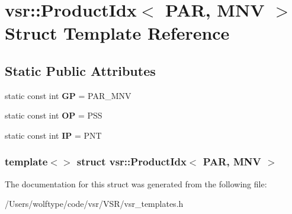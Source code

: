 \hypertarget{structvsr_1_1_product_idx_3_01_p_a_r_00_01_m_n_v_01_4}{\section{vsr\-:\-:Product\-Idx$<$ P\-A\-R, M\-N\-V $>$ Struct Template Reference}
\label{structvsr_1_1_product_idx_3_01_p_a_r_00_01_m_n_v_01_4}
}
\subsection*{Static Public Attributes}
\begin{DoxyCompactItemize}
\item 
\hypertarget{structvsr_1_1_product_idx_3_01_p_a_r_00_01_m_n_v_01_4_a95168749c4103690b52da3d3fae07b29}{static const int {\bfseries G\-P} = P\-A\-R\-\_\-\-M\-N\-V}\label{structvsr_1_1_product_idx_3_01_p_a_r_00_01_m_n_v_01_4_a95168749c4103690b52da3d3fae07b29}

\item 
\hypertarget{structvsr_1_1_product_idx_3_01_p_a_r_00_01_m_n_v_01_4_aedca912a60af592203b84b9476875cc1}{static const int {\bfseries O\-P} = P\-S\-S}\label{structvsr_1_1_product_idx_3_01_p_a_r_00_01_m_n_v_01_4_aedca912a60af592203b84b9476875cc1}

\item 
\hypertarget{structvsr_1_1_product_idx_3_01_p_a_r_00_01_m_n_v_01_4_a8d892c3050703d594eead2427c34d7a6}{static const int {\bfseries I\-P} = P\-N\-T}\label{structvsr_1_1_product_idx_3_01_p_a_r_00_01_m_n_v_01_4_a8d892c3050703d594eead2427c34d7a6}

\end{DoxyCompactItemize}
\subsubsection*{template$<$$>$ struct vsr\-::\-Product\-Idx$<$ P\-A\-R, M\-N\-V $>$}



The documentation for this struct was generated from the following file\-:\begin{DoxyCompactItemize}
\item 
/\-Users/wolftype/code/vsr/\-V\-S\-R/vsr\-\_\-templates.\-h\end{DoxyCompactItemize}
